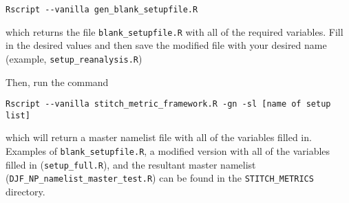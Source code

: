 \documentclass{article}
\begin{document}
\begin{verbatim}
Rscript --vanilla gen_blank_setupfile.R
\end{verbatim}

which returns the file \texttt{blank\_setupfile.R} with all of the required variables. Fill in the desired values and then save the modified file with your desired name (example, \texttt{setup\_reanalysis.R})

Then, run the command

\begin{verbatim}
Rscript --vanilla stitch_metric_framework.R -gn -sl [name of setup list]
\end{verbatim}

which will return a master namelist file with all of the variables filled in. Examples of \texttt{blank\_setupfile.R}, a modified version with all of the variables filled in (\texttt{setup\_full.R}), and the resultant master namelist (\texttt{DJF\_NP\_namelist\_master\_test.R}) can be found in the \texttt{STITCH\_METRICS} directory.


%
%
%
%
%
\end{document}
